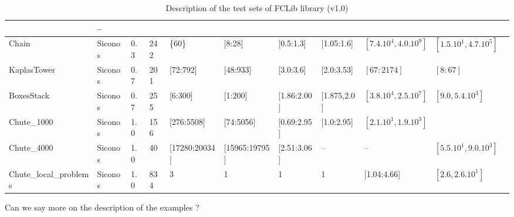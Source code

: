 {\begin{table}
\begin{tabular}{|l|l|l|l|l|l|l|l|l|l|l|}
  & -- \\
  \hline
  Chain
  & Siconos
  & 0.3
  & 242
  & \{60\}
  & [8:28]
  & [0.5:1.3]
  & [1.05:1.6]
  & $[7.4.10^{4},4.0.10^{9}]$
  & $[1.5.10^{1},4.7.10^{5}]$\\
  \hline
  KaplasTower
  & Siconos
  & 0.7
  & 201
  & [72:792]
  & [48:933]
  & [3.0:3.6]
  & [2.0:3.53]
  & $[67:2174]$
  & $[8:67]$\\
  \hline
  BoxesStack
  & Siconos
  & 0.7
  & 255
  & [6:300]
  & [1:200]
  & [1.86:2.00]
  & [1.875,2.0]
  & $[3.8.10^{4},2.5.10^{7}]$
  & $[9.0,5.4.10^{3}]$\\
  \hline
  Chute\_1000
  & Siconos
  & 1.0
  & 156
  & [276:5508]
  & [74:5056]
  & [0.69:2.95]
  & [1.0:2.95]
  & $[2.1.10^{1},1.9.10^{3}]$
  & \\
  \hline
  Chute\_4000
  & Siconos
  & 1.0
  & 40
  & [17280:20034]
  & [15965:19795]
  & [2.51:3.06]
  & --
  & --
  & $[5.5.10^{1},9.0.10^{3}]$\\
  \hline
  Chute\_local\_problems
  & Siconos
  & 1.0
  & 834
  & 3
  & 1
  & 1
  & 1
  & [1.04:4.66]
  & $[2.6,2.6.10^{1}]$\\
  \hline
\end{tabular}
\caption{Description of the test sets of FCLib library (v1.0)}
\label{Tab:fclib}
\end{table}
}


\begin{ndrva}
  Can we say more on the description of the examples ?
\end{ndrva}



